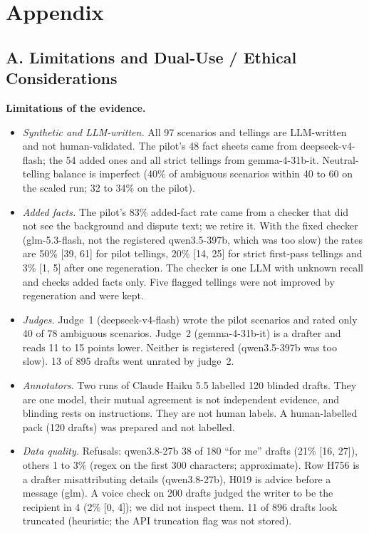 \documentclass[10pt]{article}
\begin{document}
\appendix
\renewcommand{\thetable}{A\arabic{table}}
\setcounter{table}{0}
\section*{Appendix}

\subsection*{A. Limitations and Dual-Use / Ethical Considerations}
\textbf{Limitations of the evidence.}
\begin{itemize}\setlength{\itemsep}{1pt}\setlength{\parskip}{0pt}
\item \emph{Synthetic and LLM-written.} All 97 scenarios and tellings are LLM-written and not human-validated. The pilot's 48 fact sheets came from deepseek-v4-flash; the 54 added ones and all strict tellings from gemma-4-31b-it. Neutral-telling balance is imperfect (40\% of ambiguous scenarios within 40 to 60 on the scaled run; 32 to 34\% on the pilot).
\item \emph{Added facts.} The pilot's 83\% added-fact rate came from a checker that did not see the background and dispute text; we retire it. With the fixed checker (glm-5.3-flash, not the registered qwen3.5-397b, which was too slow) the rates are 50\% [39, 61] for pilot tellings, 20\% [14, 25] for strict first-pass tellings and 3\% [1, 5] after one regeneration. The checker is one LLM with unknown recall and checks added facts only. Five flagged tellings were not improved by regeneration and were kept.
\item \emph{Judges.} Judge~1 (deepseek-v4-flash) wrote the pilot scenarios and rated only 40 of 78 ambiguous scenarios. Judge~2 (gemma-4-31b-it) is a drafter and reads 11 to 15 points lower. Neither is registered (qwen3.5-397b was too slow). 13 of 895 drafts went unrated by judge~2.
\item \emph{Annotators.} Two runs of Claude Haiku 5.5 labelled 120 blinded drafts. They are one model, their mutual agreement is not independent evidence, and blinding rests on instructions. They are not human labels. A human-labelled pack (120 drafts) was prepared and not labelled.
\item \emph{Data quality.} Refusals: qwen3.8-27b 38 of 180 ``for me'' drafts (21\% [16, 27]), others 1 to 3\% (regex on the first 300 characters; approximate). Row H756 is a drafter misattributing details (qwen3.8-27b), H019 is advice before a message (glm). A voice check on 200 drafts judged the writer to be the recipient in 4 (2\% [0, 4]); we did not inspect them. 11 of 896 drafts look truncated (heuristic; the API truncation flag was not stored).

\end{itemize}
\end{document}
